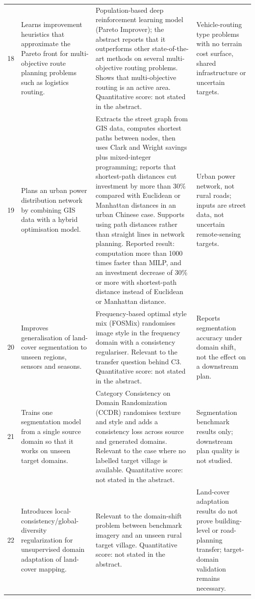 \begin{landscape}
\begin{longtable}{@{}L{0.6cm}L{7.5cm}L{8.0cm}L{7.5cm}@{}}
18 & Learns improvement heuristics that approximate the Pareto front for multi-objective route planning problems such as logistics routing. & Population-based deep reinforcement learning model (Pareto Improver); the abstract reports that it outperforms other state-of-the-art methods on several multi-objective routing problems. Shows that multi-objective routing is an active area. Quantitative score: not stated in the abstract. & Vehicle-routing type problems with no terrain cost surface, shared infrastructure or uncertain targets.  \\
19 & Plans an urban power distribution network by combining GIS data with a hybrid optimisation model. & Extracts the street graph from GIS data, computes shortest paths between nodes, then uses Clark and Wright savings plus mixed-integer programming; reports that shortest-path distances cut investment by more than 30\% compared with Euclidean or Manhattan distances in an urban Chinese case. Supports using path distances rather than straight lines in network planning. Reported result: computation more than 1000 times faster than MILP, and an investment decrease of 30\% or more with shortest-path distance instead of Euclidean or Manhattan distance. & Urban power network, not rural roads; inputs are street data, not uncertain remote-sensing targets.  \\
20 & Improves generalisation of land-cover segmentation to unseen regions, sensors and seasons. & Frequency-based optimal style mix (FOSMix) randomises image style in the frequency domain with a consistency regulariser. Relevant to the transfer question behind C3. Quantitative score: not stated in the abstract. & Reports segmentation accuracy under domain shift, not the effect on a downstream plan.  \\
21 & Trains one segmentation model from a single source domain so that it works on unseen target domains. & Category Consistency on Domain Randomization (CCDR) randomises texture and style and adds a consistency loss across source and generated domains. Relevant to the case where no labelled target village is available. Quantitative score: not stated in the abstract. & Segmentation benchmark results only; downstream plan quality is not studied.  \\
22 & Introduces local-consistency/global-diversity regularization for unsupervised domain adaptation of land-cover mapping. & Relevant to the domain-shift problem between benchmark imagery and an unseen rural target village. Quantitative score: not stated in the abstract. & Land-cover adaptation results do not prove building-level or road-planning transfer; target-domain validation remains necessary.  \\

\end{longtable}
\end{landscape}
